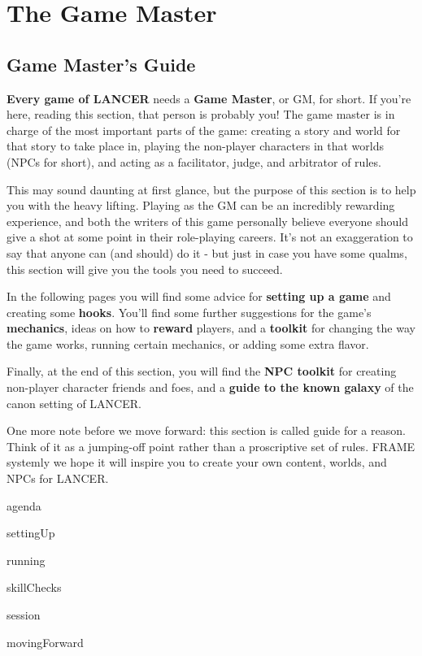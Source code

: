\chapter{The Game Master}

\section{
Game Master’s Guide
}

\textbf{Every game of LANCER} needs a \textbf{Game Master}, or GM, for short. If you’re here, reading this
section, that person is probably you! The game master is in charge of the most important parts of
the game: creating a story and world for that story to take place in, playing the non-player
characters in that worlds (NPCs for short), and acting as a facilitator, judge, and arbitrator of
rules.

This may sound daunting at first glance, but the purpose of this section is to help you with the
heavy lifting. Playing as the GM can be an incredibly rewarding experience, and both the writers
of this game personally believe everyone should give a shot at some point in their role-playing
careers. It’s not an exaggeration to say that anyone can (and should) do it - but just in case you
have some qualms, this section will give you the tools you need to succeed.

In the following pages you will find some advice for \textbf{setting up a game} and creating some
\textbf{hooks}. You’ll find some further suggestions for the game’s \textbf{mechanics}, ideas on how to \textbf{reward}
players, and a \textbf{toolkit} for changing the way the game works, running certain mechanics, or
adding some extra flavor.

Finally, at the end of this section, you will find the \textbf{NPC toolkit} for creating non-player character
friends and foes, and a \textbf{guide to the known galaxy} of the canon setting of LANCER.

One more note before we move forward: this section is called guide for a reason. Think of it as a
jumping-off point rather than a proscriptive set of rules. FRAME systemly we hope it will inspire
you to create your own content, worlds, and NPCs for LANCER.


{agenda}

{settingUp}

{running}

{skillChecks}

{session}

{movingForward}






